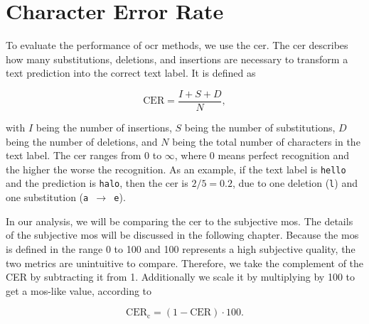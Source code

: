 \section{Character Error Rate}
\label{subsec:cer}

To evaluate the performance of \gls{ocr} methods, we use the \gls{cer}.
The \gls{cer} \cite{cer_2022} describes how many substitutions, deletions, and insertions are necessary to transform a text prediction into the correct text label.
It is defined as

\begin{equation}
    \text{CER} = \frac{I + S + D}{N},
    \label{eq:cer}
\end{equation}

with $I$ being the number of insertions, $S$ being the number of substitutions, $D$ being the number of deletions, and $N$ being the total number of characters in the text label.
The \gls{cer} ranges from 0 to $\infty$, where 0 means perfect recognition and the higher the worse the recognition.
As an example, if the text label is \texttt{hello} and the prediction is \texttt{halo}, then the \gls{cer} is $2/5 = 0.2$, due to one deletion (\texttt{l}) and one substitution (\texttt{a $\rightarrow$ e}).

In our analysis, we will be comparing the \gls{cer} to the subjective \gls{mos}.
The details of the subjective \gls{mos} will be discussed in the following chapter.
Because the \gls{mos} is defined in the range 0 to 100 and 100 represents a high subjective quality, the two metrics are unintuitive to compare.
Therefore, we take the complement of the CER by subtracting it from 1.
Additionally we scale it by multiplying by 100 to get a \gls{mos}-like value, according to

\begin{equation}
    \text{CER}_{\text{c}} = (1 - \text{CER}) \cdot 100.
    \label{eq:cer2mos}
\end{equation}

